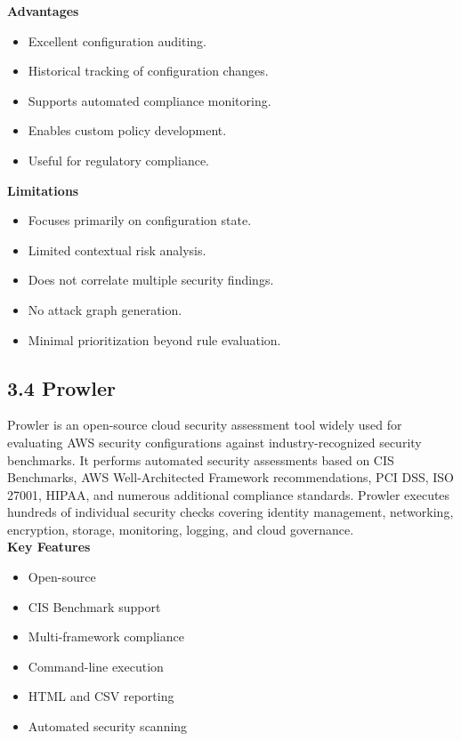 \textbf{Advantages}

\begin{itemize}
\tightlist
\item
  Excellent configuration auditing.\\
\item
  Historical tracking of configuration changes.\\
\item
  Supports automated compliance monitoring.\\
\item
  Enables custom policy development.\\
\item
  Useful for regulatory compliance.
\end{itemize}

\textbf{Limitations}

\begin{itemize}
\tightlist
\item
  Focuses primarily on configuration state.\\
\item
  Limited contextual risk analysis.\\
\item
  Does not correlate multiple security findings.\\
\item
  No attack graph generation.\\
\item
  Minimal prioritization beyond rule evaluation.
\end{itemize}

\subsection{3.4 Prowler}

Prowler is an open-source cloud security assessment tool widely used for evaluating AWS security configurations against industry-recognized security benchmarks. It performs automated security assessments based on CIS Benchmarks, AWS Well-Architected Framework recommendations, PCI DSS, ISO 27001, HIPAA, and numerous additional compliance standards. Prowler executes hundreds of individual security checks covering identity management, networking, encryption, storage, monitoring, logging, and cloud governance.\\
\textbf{Key Features}

\begin{itemize}
\tightlist
\item
  Open-source\\
\item
  CIS Benchmark support\\
\item
  Multi-framework compliance\\
\item
  Command-line execution\\
\item
  HTML and CSV reporting\\
\item
  Automated security scanning
\end{itemize}

